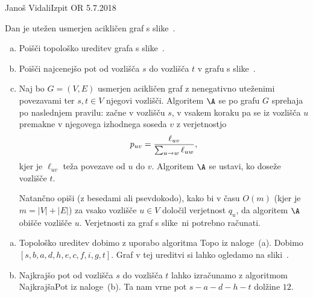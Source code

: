 \begin{naloga}{Janoš Vidali}{Izpit OR 5.7.2018}
\begin{vprasanje}
Dan je utežen usmerjen acikličen graf s slike~\fig.

\begin{enumerate}[(a)]
\item Poišči topološko ureditev grafa s slike~\fig.

\item Poišči najcenejšo pot od vozlišča $s$ do vozlišča $t$
v grafu s slike~\fig.

\item Naj bo $G = (V, E)$ usmerjen acikličen graf
z nenegativno uteženimi povezavami
ter $s, t \in V$ njegovi vozlišči.
Algoritem $\A$ se po grafu $G$ sprehaja po naslednjem pravilu:
začne v vozlišču $s$,
v vsakem koraku pa se iz vozlišča $u$ premakne
v njegovega izhodnega soseda $v$ z verjetnostjo
$$
p_{uv} = {\ell_{uv} \over \sum_{u \to w} \ell_{uw}} ,
$$
kjer je $\ell_{uv}$ teža povezave od $u$ do $v$.
Algoritem $\A$ se ustavi, ko doseže vozlišče $t$.

Natančno opiši (z besedami ali psevdokodo),
kako bi v času $O(m)$ (kjer je $m = |V| + |E|$)
za vsako vozlišče $u \in V$ določil verjetnost $q_u$,
da algoritem $\A$ obišče vozlišče $u$.
Verjetnosti za graf s slike~\fig ni potrebno računati.
\end{enumerate}

\begin{slika}
\pgfslika
{}
\end{slika}
\end{vprasanje}

\begin{odgovor}
\begin{enumerate}[(a)]
\item Topološko ureditev dobimo z uporabo algoritma {\sc Topo}
iz naloge~\res[topo]{}(a).
Dobimo $[s, b, a, d, h, e, c, f, i, g, t]$. 
Graf v tej ureditvi si lahko ogledamo na sliki~.

\item Najkrajšo pot od vozlišča $s$ do vozlišča $t$
lahko izračunamo z algoritmom {\sc NajkrajšaPot} iz naloge~\res[topo]{}(b).
Ta nam vrne pot $s - a - d - h - t$ dolžine $12$.


\end{enumerate}
\end{odgovor}
\end{naloga}
